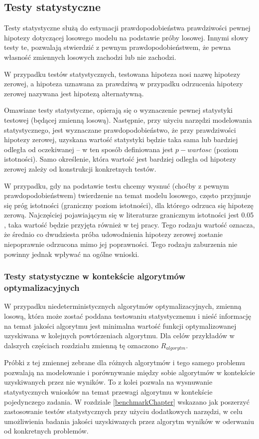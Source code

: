 \documentclass[12pt,a4paper]{report}
\begin{document}
{{{\subsection{Testy statystyczne}
\label{TestingStats}
\par{
Testy statystyczne służą do estymacji prawdopodobieństwa prawdziwości pewnej hipotezy dotyczącej losowego modelu na podstawie próby losowej. Innymi słowy testy te, pozwalają stwierdzić z pewnym prawdopodobieństwem, że pewna własność zmiennych losowych zachodzi lub nie zachodzi.
}
\par{
W przypadku testów statystycznych, testowana hipoteza nosi nazwę hipotezy zerowej, a hipoteza uznawana za prawdziwą w przypadku odrzucenia hipotezy zerowej nazywana jest hipotezą alternatywną.
}
\par{
Omawiane testy statystyczne, opierają się o wyznaczenie pewnej statystyki testowej (będącej zmienną losową). Następnie, przy użyciu narzędzi modelowania statystycznego, jest wyznaczane prawdopodobieństwo, że przy prawdziwości hipotezy zerowej, uzyskana wartość statystyki będzie taka sama lub bardziej odległa od oczekiwanej -- w ten sposób definiowana jest $p-wartosc$ (poziom istotności). Samo określenie, która wartość jest bardziej odległa od hipotezy zerowej zależy od konstrukcji konkretnych testów.
}
\par{
W przypadku, gdy na podstawie testu chcemy wysnuć (choćby z pewnym prawdopodobieństwem) twierdzenie na temat modelu losowego, często przyjmuje się próg istotności (graniczny poziom istotności), dla którego odrzuca się hipotezę zerową. Najczęściej pojawiającym się w literaturze granicznym istotności jest 0.05 \cite{lowry}, taka wartość będzie przyjęta również w tej pracy. Tego rodzaju wartość oznacza, że średnio co dwudziesta próba udowodnienia hipotezy zerowej zostanie niepoprawnie odrzucona mimo jej poprawności. Tego rodzaju zaburzenia nie powinny jednak wpływać na ogólne wnioski.
}
\subsubsection{Testy statystyczne w kontekście algorytmów optymalizacyjnych}
\par{
W przypadku niedeterministycznych algorytmów optymalizacyjnych, zmienną losową, która może zostać poddana testowaniu statystycznemu i nieść informację na temat jakości algorytmu jest minimalna wartość funkcji optymalizowanej uzyskiwana w kolejnych powtórzeniach algorytmu. Dla celów przykładów w dalszych częściach rozdziału zmienną tę oznaczono $R_{algorytm}$.
}
\par{
Próbki z tej zmiennej zebrane dla różnych algorytmów i tego samego problemu pozwalają na modelowanie i porównywanie między sobie algorytmów w kontekście uzyskiwanych przez nie wyników. To z kolei pozwala na wysnuwanie statystycznych wniosków na temat przewagi algorytmu w kontekście pojedynczego zadania. W rozdziale \ref{benchmarkChapter} wskazano jak poszerzyć zastosowanie testów statystycznych przy użyciu dodatkowych narzędzi, w celu umożliwienia badania jakości uzyskiwanych przez algorytm wyników w oderwaniu od konkretnych problemów.
}}}}
\end{document}
